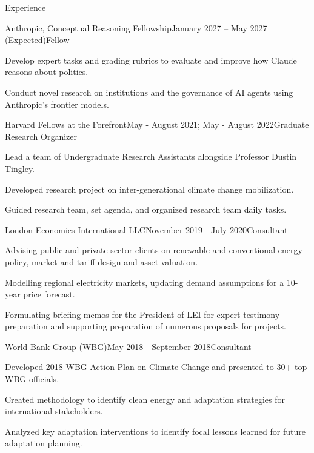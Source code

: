 \documentclass{resume}
\begin{document}
\bigskip

\begin{rSection}{\Large  E\MakeLowercase{xperience}}

\begin{rSubsection}{Anthropic, Conceptual Reasoning Fellowship}{January 2027 -- May 2027 (Expected)}{Fellow}{}
\item Develop expert tasks and grading rubrics to evaluate and improve how Claude reasons about politics.
\item Conduct novel research on institutions and the governance of AI agents using Anthropic's frontier models.
\end{rSubsection}

\begin{rSubsection}{Harvard Fellows at the Forefront}{May - August 2021; May - August 2022}{Graduate Research Organizer}{}
\item Lead a team of Undergraduate Research Assistants alongside Professor Dustin Tingley. 
\item Developed research project on inter-generational climate change mobilization. 
\item Guided research team, set agenda, and organized research team daily tasks.
\end{rSubsection}

\begin{rSubsection}{London Economics International LLC}{November 2019 - July 2020}{Consultant}{}
\item  Advising public and private sector clients on renewable and conventional energy policy, market and tariff design and asset valuation. 
\item Modelling regional electricity markets, updating demand assumptions for a 10-year price forecast.
\item Formulating briefing memos for the President of LEI for expert testimony preparation and supporting preparation of numerous proposals for projects.
\end{rSubsection}

\begin{rSubsection}{World Bank Group (WBG)}{May 2018 - September 2018}{Consultant}{}
\item Developed 2018 WBG Action Plan on Climate Change and presented to 30+ top WBG officials. 
\item Created methodology to identify clean energy and adaptation strategies for international stakeholders.
\item Analyzed key adaptation interventions to identify focal lessons learned for future adaptation planning.
\end{rSubsection}


\end{rSection}
\end{document}
